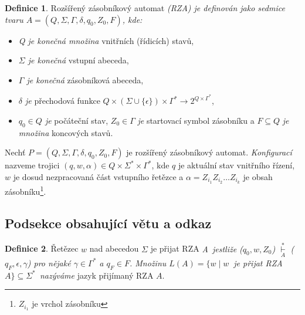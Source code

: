 \documentclass[a4paper, 11pt, twocolumn]{article}
\theoremstyle{definition}
\newtheorem{definition}{Definice}
\theoremstyle{plain}
\begin{document}
    \begin{definition}
        \label{Rozšířený zásobníkový automat}
        Rozšířený zásobníkový automat \emph{(RZA) je definován jako sedmice tvaru $A = (Q, \Sigma,\Gamma,\delta,q_{0},Z_{0},F)$, kde:}
        
        \begin{itemize}
            \item \emph{Q je konečná množina} vnitřních (řídicích) stavů,
            
            \item \emph{$\Sigma$ je konečná} vstupní abeceda,
            
            \item \emph{$\Gamma$ je konečná} zásobníková abeceda,
            
            \item \emph{$\delta$ je} přechodová funkce  $Q \times(\Sigma \cup\{\epsilon\}) \times \Gamma^{*} \rightarrow 2^{Q \times \Gamma^{*}}$,
            
            \item \emph{$q_{0} \in Q$ je} počáteční stav, $Z_{0} \in \Gamma$ \emph{je} startovací symbol zásobníku a $F \subseteq Q$ \emph{je množina} koncových stavů.
        \end{itemize} 
        
    \end{definition}
    
    Nechť $P = (Q,\Sigma,\Gamma,\delta,q_{0},Z_{0},F)$ je rozšířený zásobníkový automat. \emph{Konfigurací} nazveme trojici $(q,w,\alpha) \in Q \times \Sigma^{*} \times \Gamma^{*}$, kde $q$ je aktuální stav vnitřního řízení, $w$ je dosud nezpracovaná část vstupního řetězce a $\alpha = Z_{i_{1}} Z_{i_{2}} \ldots Z_{i_{k}}$ je obsah zásobníku\footnote{$Z_{i_{1}}$ je vrchol zásobníku}.
    
    \subsection{Podsekce obsahující větu a odkaz}
        \begin{definition}
            \label{Řetězec}
            Řetězec $w$ nad abecedou $\Sigma$ je přijat RZA \emph{A~jestliže ($q_{0}, w, Z_{0}$) $\underset{{A}}{\overset{*}{\vdash}}$ ($q_{F},\epsilon,\gamma$) pro nějaké $\gamma \in \Gamma^{*}$ a $q_{F} \in F$. Množinu $L(A)=\{w \mid w\ $  je přijat RZA $A\} \subseteq \Sigma^{*}$~nazýváme} jazyk přijímaný RZA $A$.
        \end{definition}
        
\end{document}
